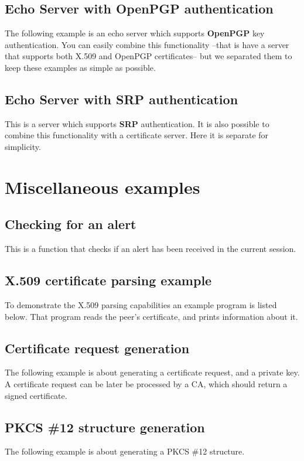 \subsection{Echo Server with OpenPGP authentication}
The following example is an echo server which supports {\bf OpenPGP} key 
authentication. You can easily combine this functionality --that is have
a server that supports both X.509 and OpenPGP certificates-- but we
separated them to keep these examples as simple as possible.



\subsection{Echo Server with SRP authentication}
This is a server which supports {\bf SRP} authentication. It is also
possible to combine this functionality with a certificate server. Here it
is separate for simplicity.


\section{Miscellaneous examples}

\subsection{Checking for an alert}
This is a function that checks if an alert has been received
in the current session.


\subsection{X.509 certificate parsing example}
\label{ex:x509-info}
To demonstrate the X.509 parsing capabilities an example program is listed below.
That program reads the peer's certificate, and prints information about it.


\subsection{Certificate request generation}
\label{ex:crq}
The following example is about generating a certificate request, and
a private key. A certificate request can be later be processed by a CA,
which should return a signed certificate.



\subsection{PKCS \#12 structure generation}
\label{ex:pkcs12}
The following example is about generating a PKCS \#12 structure.






